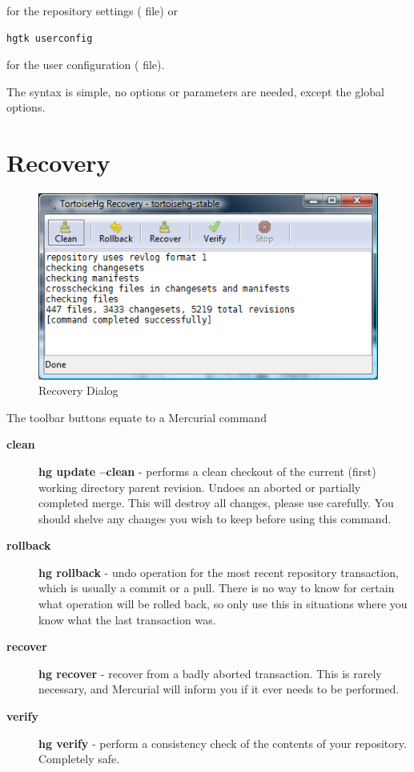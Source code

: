 \documentclass[letterpaper,10pt,english]{manual}
\begin{document}
for the repository settings ( file) or

\begin{Verbatim}[commandchars=@\[\]]
hgtk userconfig
\end{Verbatim}

for the user configuration ( file).

The syntax is simple, no options or parameters are needed, except the global
options.

\resetcurrentobjects
\hypertarget{--doc-recovery}{}

\chapter{Recovery}
\hypertarget{module-recovery.dialog}{}
\begin{figure}[htbp]
\centering

\includegraphics{recover.png}
\caption{Recovery Dialog}\end{figure}

The toolbar buttons equate to a Mercurial command
\begin{description}
\item[\textbf{clean}]
\textbf{hg update --clean} - performs a clean checkout of the
current (first) working directory parent revision.  Undoes an
aborted or partially completed merge.  This will destroy all
changes, please use carefully.  You should shelve any changes you
wish to keep before using this command.

\item[\textbf{rollback}]
\textbf{hg rollback} - undo operation for the most recent
repository transaction, which is usually a commit or a pull.  There
is no way to know for certain what operation will be rolled back, so
only use this in situations where you know what the last transaction
was.

\item[\textbf{recover}]
\textbf{hg recover} - recover from a badly aborted transaction.
This is rarely necessary, and Mercurial will inform you if it ever
needs to be performed.

\item[\textbf{verify}]
\textbf{hg verify} - perform a consistency check of the contents of your
repository.  Completely safe.

\end{description}
\end{document}
